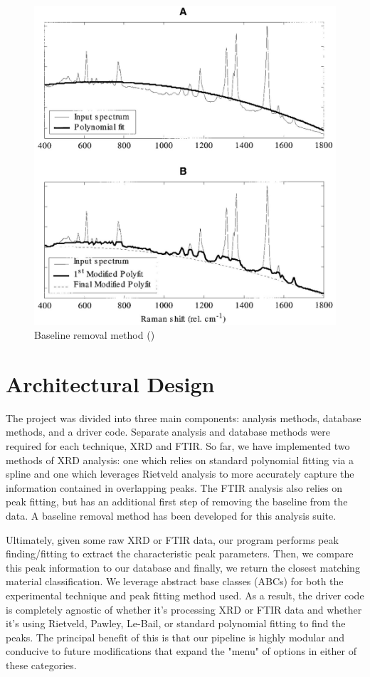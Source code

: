 \documentclass{dhbenelux}
\begin{document}
\begin{figure}[!h]
    \centering
    \includegraphics[scale=0.75]{BASELINE FITTING.JPG}
    \caption{Baseline removal method  (\cite{baseline_removal})}
    \label{fig:baseline}
    
\end{figure}

\section{Architectural Design} \label{design}

The project was divided into three main components: analysis methods, database methods, and a driver code. Separate analysis and database methods were required for each technique, XRD and FTIR. So far, we have implemented two methods of XRD analysis: one which relies on standard polynomial fitting via a spline and one which leverages Rietveld analysis to more accurately capture the information contained in overlapping peaks. The FTIR analysis also relies on peak fitting, but has an additional first step of removing the baseline from the data. A baseline removal method has been developed for this analysis suite. 

Ultimately, given some raw XRD or FTIR data, our program performs peak finding/fitting to extract the characteristic peak parameters. Then, we compare this peak information to our database and finally, we return the closest matching material classification. We leverage abstract base classes (ABCs) for both the experimental technique and peak fitting method used. As a result, the driver code is completely agnostic of whether it's processing XRD or FTIR data and whether it's using Rietveld, Pawley, Le-Bail, or standard polynomial fitting to find the peaks. The principal benefit of this is that our pipeline is highly modular and conducive to future modifications that expand the "menu" of options in either of these categories. 
\end{document}
